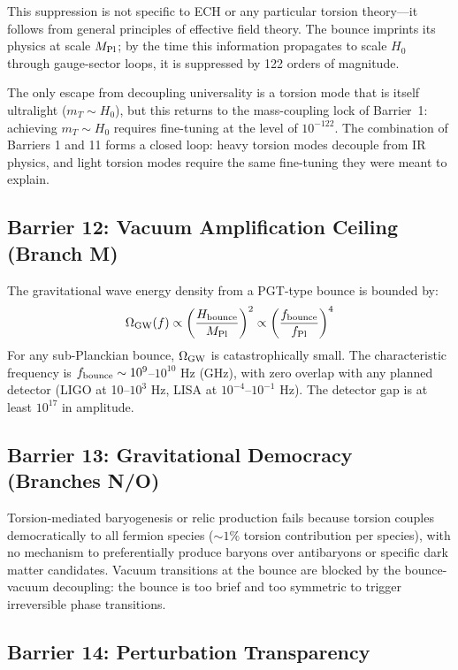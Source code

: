 \documentclass[a4paper,11pt]{article}
\newcommand{\Mpl}{M_{\rm Pl}}
\begin{document}
This suppression is not specific to ECH or any particular torsion theory---it follows from general principles of effective field theory. The bounce imprints its physics at scale $\Mpl$; by the time this information propagates to scale $H_0$ through gauge-sector loops, it is suppressed by 122 orders of magnitude.

The only escape from decoupling universality is a torsion mode that is itself ultralight ($m_T \sim H_0$), but this returns to the mass-coupling lock of Barrier~1: achieving $m_T \sim H_0$ requires fine-tuning at the level of $10^{-122}$. The combination of Barriers 1 and 11 forms a closed loop: heavy torsion modes decouple from IR physics, and light torsion modes require the same fine-tuning they were meant to explain.

\subsection{Barrier 12: Vacuum Amplification Ceiling (Branch M)}

The gravitational wave energy density from a PGT-type bounce is bounded by:
\begin{equation}
\Omega_{\rm GW}(f) \propto \left(\frac{H_{\rm bounce}}{\Mpl}\right)^2 \propto \left(\frac{f_{\rm bounce}}{f_{\rm Pl}}\right)^4
\end{equation}
For any sub-Planckian bounce, $\Omega_{\rm GW}$ is catastrophically small. The characteristic frequency is $f_{\rm bounce} \sim 10^9$--$10^{10}$ Hz (GHz), with zero overlap with any planned detector (LIGO at 10--$10^3$ Hz, LISA at $10^{-4}$--$10^{-1}$ Hz). The detector gap is at least $10^{17}$ in amplitude.

\subsection{Barrier 13: Gravitational Democracy (Branches N/O)}

Torsion-mediated baryogenesis or relic production fails because torsion couples democratically to all fermion species ($\sim 1\%$ torsion contribution per species), with no mechanism to preferentially produce baryons over antibaryons or specific dark matter candidates. Vacuum transitions at the bounce are blocked by the bounce-vacuum decoupling: the bounce is too brief and too symmetric to trigger irreversible phase transitions.

\subsection{Barrier 14: Perturbation Transparency}
\end{document}
